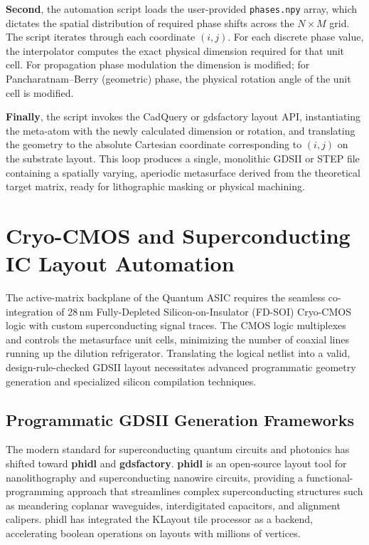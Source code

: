\documentclass[11pt, a4paper]{article}
\begin{document}
\textbf{Second}, the automation script loads the user-provided \texttt{phases.npy} array, which dictates the spatial distribution of required phase shifts across the $N \times M$ grid. The script iterates through each coordinate $(i, j)$. For each discrete phase value, the interpolator computes the exact physical dimension required for that unit cell. For propagation phase modulation the dimension is modified; for Pancharatnam--Berry (geometric) phase, the physical rotation angle of the unit cell is modified.

\textbf{Finally}, the script invokes the CadQuery or gdsfactory layout API, instantiating the meta-atom with the newly calculated dimension or rotation, and translating the geometry to the absolute Cartesian coordinate corresponding to $(i, j)$ on the substrate layout. This loop produces a single, monolithic GDSII or STEP file containing a spatially varying, aperiodic metasurface derived from the theoretical target matrix, ready for lithographic masking or physical machining.

\section{Cryo-CMOS and Superconducting IC Layout Automation}

The active-matrix backplane of the Quantum ASIC requires the seamless co-integration of 28\,nm Fully-Depleted Silicon-on-Insulator (FD-SOI) Cryo-CMOS logic with custom superconducting signal traces. The CMOS logic multiplexes and controls the metasurface unit cells, minimizing the number of coaxial lines running up the dilution refrigerator. Translating the logical netlist into a valid, design-rule-checked GDSII layout necessitates advanced programmatic geometry generation and specialized silicon compilation techniques.

\subsection{Programmatic GDSII Generation Frameworks}

The modern standard for superconducting quantum circuits and photonics has shifted toward \textbf{phidl} and \textbf{gdsfactory}. \textbf{phidl} is an open-source layout tool for nanolithography and superconducting nanowire circuits, providing a functional-programming approach that streamlines complex superconducting structures such as meandering coplanar waveguides, interdigitated capacitors, and alignment calipers. phidl has integrated the KLayout tile processor as a backend, accelerating boolean operations on layouts with millions of vertices.
\end{document}
